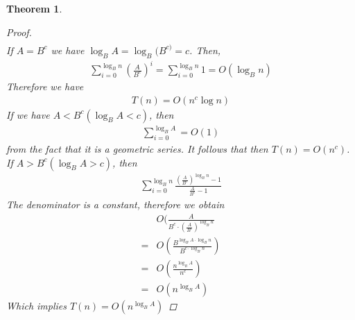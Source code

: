 \documentclass[a4paper]{article}
\theoremstyle{plain}
\newtheorem{thm}{Theorem}[section]
\theoremstyle{definition}
\theoremstyle{remark}
\begin{document}
\begin{thm}
\begin{proof}
\begin{align*}
		\end{align*}
		If $A = B^{c}$ we have $\log_B A = \log_B(B^{c)} = c$. Then,
		\begin{align*}
			\sum_{i=0}^{\log_B n} \left( \frac{A}{B^{c}} \right) ^{i} = \sum_{i=0}^{\log_B n} 1 = O(\log_B n)		\end{align*}
			Therefore we have
			\begin{align*}
				T(n) = O(n^{c} \log n)
			\end{align*}
			If we have $A < B^{c} (\log_B A < c)$, then
			\begin{align*}
				\sum_{i=0}^{\log_B A} = O(1)
			\end{align*}
			from the fact that it is a geometric series.
			It follows that then $T(n) = O(n^{c})$.\\
			If $A>B^{c} (\log_B A > c)$, then
			\begin{align*}
				\sum_{i=0}^{\log_B n} \frac{\left( \frac{A}{B^{c}} \right)^{\log_B n}-1}{\frac{A}{B^{c}}-1}
			\end{align*}
			The denominator is a constant, therefore we obtain
			\begin{align*}
				&O(\frac{A}{B^{c}\cdot\left( \frac{A}{B^{c}} \right) ^{\log_B n}}\\
				=&O(\frac{B^{\log_B A \cdot \log_B n}}{B^{c \cdot \log_B n}}) \\
				=&O(\frac{n^{\log_B A}}{n^{c}}) \\
				=&O(n^{\log_B A})
			\end{align*}
			Which implies $T(n) = O(n^{\log_B A})$
	\end{proof}
	\end{thm}
\end{document}
